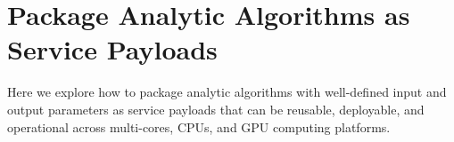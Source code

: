 
\section{Package Analytic Algorithms as Service Payloads}
\label{sec:package}

Here we explore how to package analytic algorithms with well-defined
input and output parameters as service payloads that can be reusable,
deployable, and operational across multi-cores, CPUs, and GPU
computing platforms.
